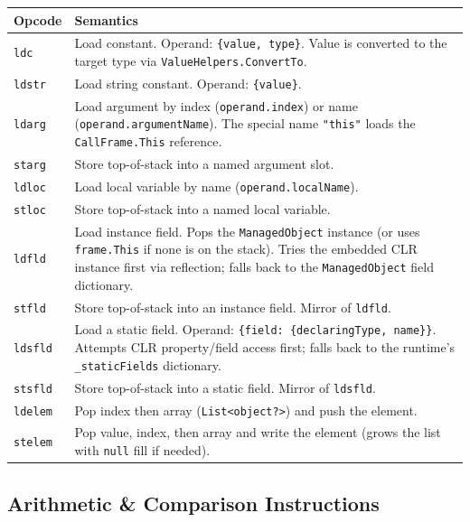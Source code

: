 \documentclass[11pt,a4paper]{article}
\newcommand{\code}[1]{\texttt{\small #1}}
\newcommand{\typename}[1]{\textcolor{typecolor}{\texttt{\small #1}}}
\begin{document}
\begin{longtable}{lp{10cm}}
  \toprule
  \textbf{Opcode} & \textbf{Semantics} \\
  \midrule
  \endhead
  \code{ldc}    & Load constant. Operand: \code{\{value, type\}}. Value is converted
                  to the target type via \typename{ValueHelpers}\code{.ConvertTo}. \\
  \code{ldstr}  & Load string constant. Operand: \code{\{value\}}. \\
  \code{ldarg}  & Load argument by index (\code{operand.index}) or name
                  (\code{operand.argumentName}). The special name \texttt{"this"}
                  loads the \code{CallFrame.This} reference. \\
  \code{starg}  & Store top-of-stack into a named argument slot. \\
  \code{ldloc}  & Load local variable by name (\code{operand.localName}). \\
  \code{stloc}  & Store top-of-stack into a named local variable. \\
  \code{ldfld}  & Load instance field. Pops the \typename{ManagedObject} instance
                  (or uses \code{frame.This} if none is on the stack). Tries the
                  embedded CLR instance first via reflection; falls back to the
                  \typename{ManagedObject} field dictionary. \\
  \code{stfld}  & Store top-of-stack into an instance field. Mirror of \code{ldfld}. \\
  \code{ldsfld} & Load a static field. Operand: \code{\{field: \{declaringType, name\}\}}.
                  Attempts CLR property/field access first; falls back to the
                  runtime's \code{\_staticFields} dictionary. \\
  \code{stsfld} & Store top-of-stack into a static field. Mirror of \code{ldsfld}. \\
  \code{ldelem} & Pop index then array (\code{List<object?>}) and push the element. \\
  \code{stelem} & Pop value, index, then array and write the element (grows the list
                  with \code{null} fill if needed). \\
  \bottomrule
\end{longtable}

\subsection{Arithmetic \& Comparison Instructions}
\end{document}
